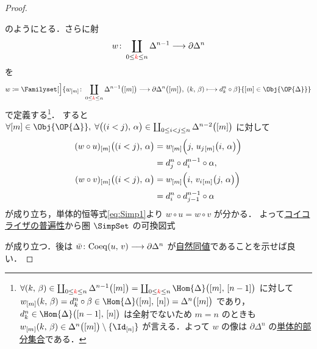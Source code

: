 \documentclass[TQFT_main]{subfiles}
\begin{document}
\begin{proof}
\begin{center}
    \end{center}
    のようにとる．さらに射
    \begin{align}
        w \colon \coprod_{0 \le \textcolor{red}{k} \le n} \Delta^{n-1} \longrightarrow \partial \Delta^n
    \end{align}
    を
    \begin{align}
        w \coloneqq \Familyset[\Big]{w_{[m]} \colon \coprod_{0 \le \textcolor{red}{k} \le n} \Delta^{n-1} \bigl( [m] \bigr) \lto \partial \Delta^n \bigl( [m] \bigr),\; (k,\, \beta) \lmto d^n_k \circ \beta  }{[m] \in \Obj{\OP{\Delta}}}
    \end{align}
    で定義する\footnote{$\forall (k,\, \beta) \in  \coprod_{0 \le \textcolor{red}{k} \le n} \Delta^{n-1} \bigl( [m] \bigr)  =  \coprod_{0 \le \textcolor{red}{k} \le n} \Hom{\Delta}\bigl( [m],\, [n-1] \bigr)$ に対して $w_{[m]}(k,\, \beta) = d^n_k \circ \beta \in \Hom{\Delta}([m],\, [n]) = \Delta^n \bigl( [m] \bigr)$ であり，$d^n_k \in \Hom{\Delta}\bigl( [n-1],\, [n] \bigr)$ は全射でないため $m=n$ のときも $w_{[m]}(k,\, \beta) \in \Delta^n \bigl( [m] \bigr) \setminus \{\Id_{[n]}\}$ が言える．よって $w$ の像は $\partial \Delta^n$ の\hyperref[def:SimpSet]{単体的部分集合}である．}．
    すると $\forall [m] \in \Obj{\OP{\Delta}},\; \forall \bigl( (i<j),\, \alpha \bigr) \in \coprod_{0 \le i < j \le n} \Delta^{n-2}\bigl( [m] \bigr)$ に対して
    \begin{align}
        (w \circ u)_{[m]} \bigl( (i<j),\, \alpha \bigr)
        &= w_{[m]} \Bigl(j,\, u_j{}_{[m]} \bigl( i,\, \alpha \bigr) \Bigr) \\
        &= d^n_j \circ d^{n-1}_i \circ \alpha, \\
        (w \circ v)_{[m]} \bigl( (i<j),\, \alpha \bigr) 
        &= w_{[m]} \Bigl( i,\, v_i{}_{[m]} \bigl( j,\, \alpha \bigr)  \Bigr) \\
        &= d^n_i \circ d^{n-1}_{j-1} \circ \alpha
    \end{align}
    が成り立ち，単体的恒等式\eqref{eq:Simp1}より $w \circ u = w \circ v$ が分かる．
    よって\hyperref[def:colim]{コイコライザの普遍性}から圏 $\SimpSet$ の可換図式
    \begin{center}
    \end{center}
    が成り立つ．後は $\bar{w} \colon \mathrm{Coeq}(u,\, v) \longrightarrow \partial \Delta^n$ が\hyperref[def:nat]{自然同値}であることを示せば良い．


\end{proof}
\end{document}
